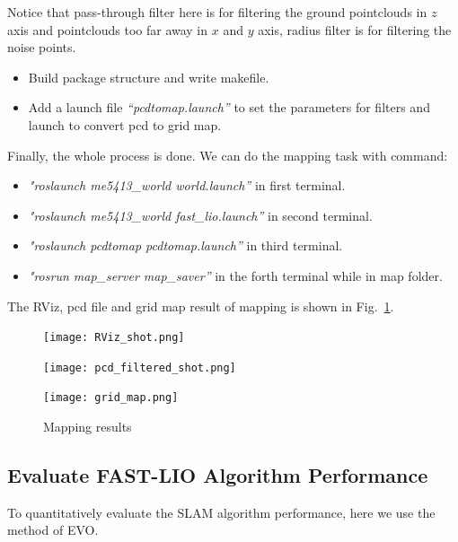 \documentclass[hyperref]{article}
\theoremstyle{nonumberplain}
\begin{document}
Notice that pass-through filter here is for filtering the ground pointclouds in $z$ axis and pointclouds too far away in $x$ and $y$ axis, radius filter is for filtering the noise points.

\begin{itemize}[itemsep=3pt,topsep=0pt,parsep=0pt]
	\item Build package structure and write makefile.
	\item Add a launch file \textit{“pcdtomap.launch”} to set the parameters for filters and launch to convert pcd to grid map.
\end{itemize}

Finally, the whole process is done. We can do the mapping task with command:

\begin{itemize}[itemsep=3pt,topsep=0pt,parsep=0pt]
	\item \textit{"roslaunch me5413\_world world.launch”} in first terminal.
	\item \textit{"roslaunch me5413\_world fast\_lio.launch”} in second terminal.
	\item \textit{"roslaunch pcdtomap pcdtomap.launch”} in third terminal.
	\item \textit{"rosrun map\_server map\_saver”} in the forth terminal while in map folder.
\end{itemize}


The RViz, pcd file and grid map result of mapping is shown in Fig.~\ref{fig4}.

\begin{figure}[H]
	\centering
	\begin{minipage}[t]{0.32\textwidth}
		\centering
		\texttt{[image: RViz\_shot.png]}
		\label{fig4a}
	\end{minipage}
	\begin{minipage}[t]{0.32\textwidth}
		\centering
		\texttt{[image: pcd\_filtered\_shot.png]}
		\label{fig4b}
	\end{minipage}
	\begin{minipage}[t]{0.32\textwidth}
		\centering
		\texttt{[image: grid\_map.png]}
		\label{fig4c}
	\end{minipage}
	\caption{Mapping results}
	\label{fig4}
\end{figure} 

\subsection{Evaluate FAST-LIO Algorithm Performance}
\hspace{1.0em}
To quantitatively evaluate the SLAM algorithm performance, here we use the method of EVO.
\end{document}
